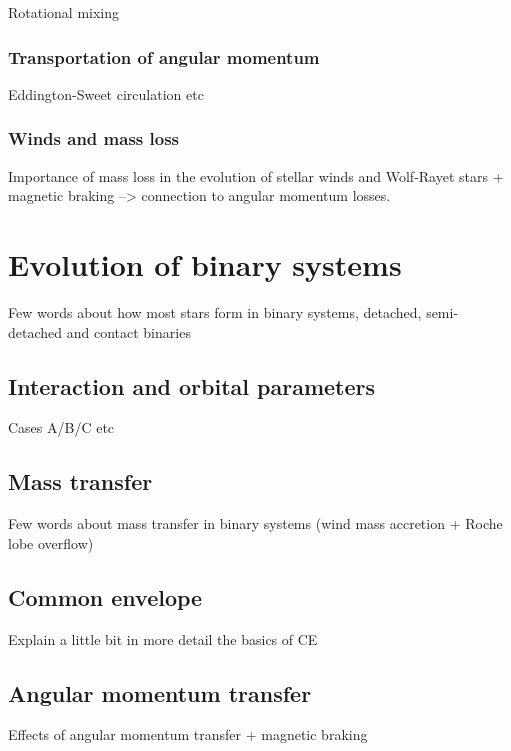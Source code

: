 \documentclass[../../main/thesis_msc.tex]{subfiles}
\begin{document}
						Rotational mixing 
						
						
					\subsubsection{Transportation of angular momentum}
					
						Eddington-Sweet circulation etc
						
					\subsubsection{Winds and mass loss}
					
						Importance of mass loss in the evolution of stellar winds and Wolf-Rayet stars + magnetic braking --> connection to angular momentum losses.
						
					
				
	\section{Evolution of binary systems}
	
		Few words about how most stars form in binary systems, detached, semi-detached and contact binaries
		
			\subsection{Interaction and orbital parameters}
			
				Cases A/B/C etc
				
			\subsection{Mass transfer}
			
				Few words about mass transfer in binary systems (wind mass accretion + Roche lobe overflow)
				
			\subsection{Common envelope}
			
				Explain a little bit in more detail the basics of CE
				
			\subsection{Angular momentum transfer}
			
				Effects of angular momentum transfer + magnetic braking
				
\end{document}
